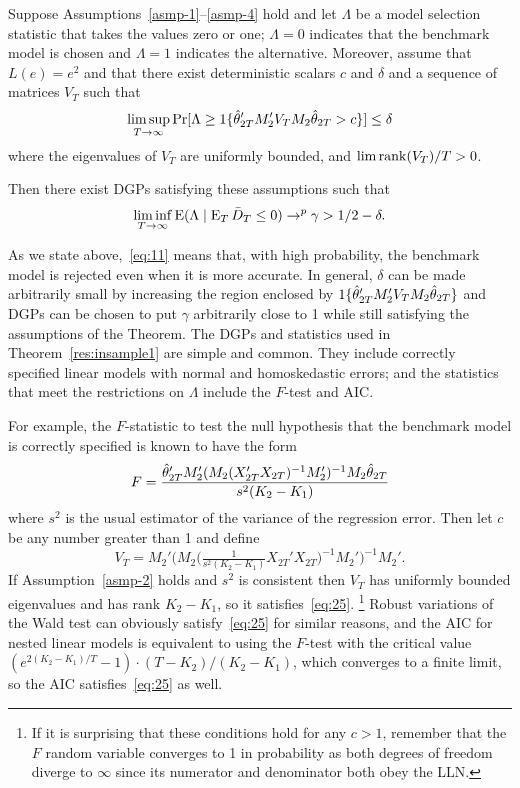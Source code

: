 \documentclass[12pt]{article}
\begin{document}
\begin{thm}\label{res:insample1}
  Suppose Assumptions~\ref{asmp-1}--\ref{asmp-4} hold and let
  $\Lambda$ be a model selection statistic that takes the values zero
  or one; $\Lambda = 0$ indicates that the benchmark model is chosen
  and $\Lambda = 1$ indicates the alternative.  Moreover, assume that
  $L(e) = e^2$ and that there exist deterministic scalars $c$ and
  $\delta$ and a sequence of matrices $V_T$ such that
  \begin{equation}\label{eq:25}
    \limsup_{T \to \infty}
    \Pr[\Lambda \geq \operatorname{1}\{\hat\theta_{2T}'M_2' V_T M_2\hat\theta_{2T} > c \}]
    \leq \delta
  \end{equation}
  where the eigenvalues of $V_T$ are uniformly bounded, and $\lim
  \operatorname*{rank}(V_T)/T > 0$.

  Then there exist DGPs satisfying these assumptions such that
  \begin{equation}\label{eq:11}
    \liminf_{T \to \infty} \operatorname{E}( \Lambda \mid \operatorname{E}_T \bar{D}_{T} \leq 0 )
    \to^p \gamma > 1/2 - \delta.
  \end{equation}
\end{thm}

As we state above,~\eqref{eq:11} means that, with high probability,
the benchmark model is rejected even when it is more accurate. In
general, $\delta$ can be made arbitrarily small by increasing the
region enclosed by $\operatorname{1}\{\hat\theta_{2T}'M_2' V_T M_2\hat\theta_{2T}\}$ and DGPs can be
chosen to put $\gamma$ arbitrarily close to 1 while still satisfying
the assumptions of the Theorem.  The DGPs and
statistics used in Theorem~\ref{res:insample1} are simple and
common. They include correctly specified linear models with normal and
homoskedastic errors; and the statistics that meet the restrictions on
$\Lambda$ include the $F$-test and AIC.

For example, the $F$-statistic to test the null hypothesis that the
benchmark model is correctly specified is known to have the form
\begin{equation*}
  F = \frac{\hat\theta_{2T}' M_2' ( M_2 (X_{2T}'X_{2T})^{-1} M_2' )^{-1} M_2
    \hat\theta_{2T}}{s^2 (K_2 - K_1)}
\end{equation*}
where $s^2$ is the usual estimator of the variance of the regression
error. Then let $c$ be any number greater than 1 and define
\begin{equation*}
  V_T = M_2' \big( M_2 \big(\tfrac{1}{s^2 (K_2 - K_1)} X_{2T}'X_{2T}\big)^{-1}
  M_2' \big)^{-1} M_2'.
\end{equation*}
If Assumption~\ref{asmp-2} holds and $s^2$ is consistent then $V_T$
has uniformly bounded eigenvalues and has rank $K_2 - K_1$, so it
satisfies~\eqref{eq:25}.%
\footnote{If it is surprising that these conditions hold for any $c >
  1$, remember that the $F$ random variable converges to 1 in
  probability as both degrees of freedom diverge to $\infty$ since its
  numerator and denominator both obey the LLN.} %
Robust variations of the Wald test can obviously satisfy~\eqref{eq:25}
for similar reasons, and the AIC for nested linear models is
equivalent to using the $F$-test with the critical value %
$(e^{2 (K_2 - K_1) / T} - 1) \cdot (T - K_2) / (K_2 - K_1)$, %
which converges to a finite limit, so the AIC satisfies~\eqref{eq:25}
as well.
\end{document}
